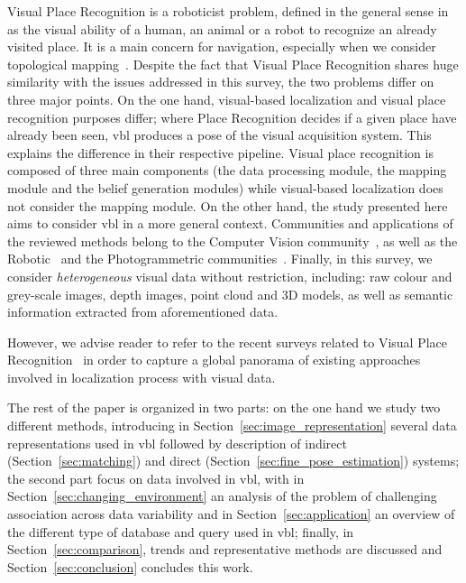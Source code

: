 		Visual Place Recognition is a roboticist problem, defined in the general sense in~\citep{Lowry2016} as the visual ability of a human, an animal or a robot to recognize an already visited place. It is a main concern for navigation, especially when we consider topological mapping~\citep{Garcia-Fidalgo2015}. Despite the fact that Visual Place Recognition shares huge similarity with the issues addressed in this survey, the two problems differ on three major points. On the one hand, visual-based localization and visual place recognition purposes differ; where Place Recognition decides if a given place have already been seen, \ac{vbl} produces a pose of the visual acquisition system. This explains the difference in their respective pipeline. Visual place recognition is composed of three main components (the data processing module, the mapping module and the belief generation modules) while visual-based localization does not consider the mapping module. On the other hand, the study presented here aims to consider \ac{vbl} in a more general context. Communities and applications of the reviewed methods belong to the Computer Vision community~\citep{Sattler2011}, as well as the Robotic~\citep{Garcia-Fidalgo2015} and the Photogrammetric communities~\citep{Wan2016}. Finally, in this survey, we consider \textit{heterogeneous} visual data without restriction, including: raw colour and grey-scale images, depth images, point cloud and 3D models, as well as semantic information extracted from aforementioned data. 
	
		However, we advise reader to refer to the recent surveys related to Visual Place Recognition~\citep{Lowry2016,Garcia-Fidalgo2015,Kostavelis2015} in order to capture a global panorama of existing approaches involved in localization process with visual data.		

		\bigskip
		The rest of the paper is organized in two parts: on the one hand we study two different methods, introducing in Section~\ref{sec:image_representation} several data representations used in \ac{vbl} followed by description of indirect (Section~\ref{sec:matching}) and direct (Section~\ref{sec:fine_pose_estimation}) systems; the second part focus on data involved in \ac{vbl}, with in Section~\ref{sec:changing_environment} an analysis of the problem of challenging association across data variability and in Section~\ref{sec:application} an overview of the different type of database and query used in \ac{vbl}; finally, in Section~\ref{sec:comparison}, trends and representative methods are discussed and Section~\ref{sec:conclusion} concludes this work.